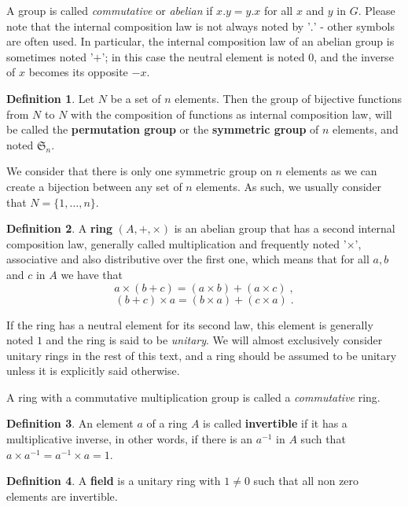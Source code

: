 \documentclass{report}
\theoremstyle{definition}
\newtheorem{defin}{Definition}
\theoremstyle{remark}
\begin{document}
 A group is called \textit{commutative} or \textit{abelian} if $x.y = y.x$ for all $x$ and $y$ in $G$.
 Please note that the internal composition law is not always noted by '$.$' - other symbols are often used. In particular, the internal composition law of an abelian group is sometimes noted '$+$'; in this case the neutral element is noted $0$, and the inverse of $x$ becomes its opposite $-x$.
 
 
\begin{defin}
    Let $N$ be a set of $n$ elements. Then the group of bijective functions from $N$ to $N$ with the composition of functions as internal composition law, will be called the \textbf{permutation group} or the \textbf{symmetric group} of $n$ elements, and noted $\mathfrak{S}_n$.
\end{defin}

We consider that there is only one symmetric group on $n$ elements as we can create a bijection between any set of $n$ elements. As such, we usually consider that $N = \{1, \dots, n \}$. 
 
 \begin{defin}
  A \textbf{ring} $(A,+,\times)$ is an abelian group that has a second internal composition law, generally called multiplication and frequently noted '$\times$', associative and also distributive over the first one, which means that for all $a,b$ and $c$ in $A$ we have that $$ a \times (b + c) = (a \times b) + (a \times c)\;,$$ $$ (b+c)\times a = (b \times a)  + (c \times a)\;.$$
 \end{defin}
 
 If the ring has a neutral element for its second law, this element is generally noted $1$ and the ring is said to be \textit{unitary}. We will almost exclusively consider unitary rings in the rest of this text, and a ring should be assumed to be unitary unless it is explicitly said otherwise. 
 
 A ring with a commutative multiplication group is called a \textit{commutative} ring. 
 
 \begin{defin}
    An element $a$ of a ring $A$ is called \textbf{invertible} if it has a multiplicative inverse, in other words, if there is an $a^{-1}$ in $A$ such that $a \times a^{-1} = a^{-1} \times a= 1$. 
 \end{defin}
 
 \begin{defin}
    A \textbf{field} is a unitary ring with $1 \neq 0 $ such that all non zero elements are invertible.
 \end{defin}
 
\end{document}
